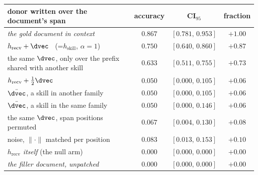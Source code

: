 \begin{tabular}{@{}lccc@{}}
\toprule
donor written over the document's span & accuracy & CI$_{95}$ & fraction \\
\midrule
\emph{the gold document in context} & $0.867$ & $[0.781,\,0.953]$ & $+1.00$ \\
$h_{\text{recv}}+\dvec$ \ (=$h_{\text{skill}}$, $\alpha=1$) & $0.750$ & $[0.640,\,0.860]$ & $+0.87$ \\
the same $\dvec$, only over the prefix shared with another skill & $0.633$ & $[0.511,\,0.755]$ & $+0.73$ \\
$h_{\text{recv}}+\tfrac12\dvec$ & $0.050$ & $[0.000,\,0.105]$ & $+0.06$ \\
$\bar{\dvec}$, a skill in another family & $0.050$ & $[0.000,\,0.105]$ & $+0.06$ \\
$\bar{\dvec}$, a skill in the same family & $0.050$ & $[0.000,\,0.146]$ & $+0.06$ \\
the same $\dvec$, span positions permuted & $0.067$ & $[0.004,\,0.130]$ & $+0.08$ \\
noise, $\|\cdot\|$ matched per position & $0.083$ & $[0.013,\,0.153]$ & $+0.10$ \\
\emph{$h_{\text{recv}}$ itself} (the null arm) & $0.000$ & $[0.000,\,0.000]$ & $+0.00$ \\
\emph{the filler document, unpatched} & $0.000$ & $[0.000,\,0.000]$ & $+0.00$ \\
\bottomrule
\end{tabular}
